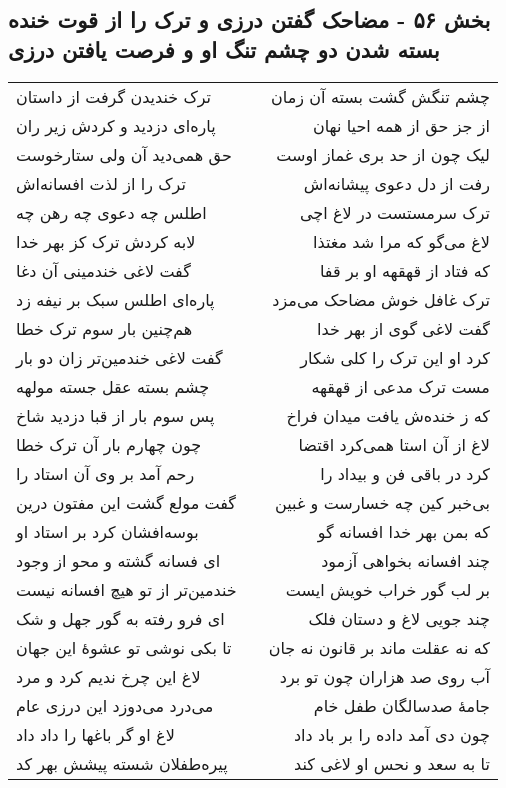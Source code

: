 \begin{center}
\section*{بخش ۵۶ - مضاحک گفتن درزی و ترک را از قوت خنده بسته شدن دو چشم تنگ او و فرصت یافتن درزی}
\label{sec:sh056}
\begin{longtable}{l p{0.5cm} r}
ترک خندیدن گرفت از داستان
&&
چشم تنگش گشت بسته آن زمان
\\
پاره‌ای دزدید و کردش زیر ران
&&
از جز حق از همه احیا نهان
\\
حق همی‌دید آن ولی ستارخوست
&&
لیک چون از حد بری غماز اوست
\\
ترک را از لذت افسانه‌اش
&&
رفت از دل دعوی پیشانه‌اش
\\
اطلس چه دعوی چه رهن چه
&&
ترک سرمستست در لاغ اچی
\\
لابه کردش ترک کز بهر خدا
&&
لاغ می‌گو که مرا شد مغتذا
\\
گفت لاغی خندمینی آن دغا
&&
که فتاد از قهقهه او بر قفا
\\
پاره‌ای اطلس سبک بر نیفه زد
&&
ترک غافل خوش مضاحک می‌مزد
\\
هم‌چنین بار سوم ترک خطا
&&
گفت لاغی گوی از بهر خدا
\\
گفت لاغی خندمین‌تر زان دو بار
&&
کرد او این ترک را کلی شکار
\\
چشم بسته عقل جسته مولهه
&&
مست ترک مدعی از قهقهه
\\
پس سوم بار از قبا دزدید شاخ
&&
که ز خنده‌ش یافت میدان فراخ
\\
چون چهارم بار آن ترک خطا
&&
لاغ از آن استا همی‌کرد اقتضا
\\
رحم آمد بر وی آن استاد را
&&
کرد در باقی فن و بیداد را
\\
گفت مولع گشت این مفتون درین
&&
بی‌خبر کین چه خسارست و غبین
\\
بوسه‌افشان کرد بر استاد او
&&
که بمن بهر خدا افسانه گو
\\
ای فسانه گشته و محو از وجود
&&
چند افسانه بخواهی آزمود
\\
خندمین‌تر از تو هیچ افسانه نیست
&&
بر لب گور خراب خویش ایست
\\
ای فرو رفته به گور جهل و شک
&&
چند جویی لاغ و دستان فلک
\\
تا بکی نوشی تو عشوهٔ این جهان
&&
که نه عقلت ماند بر قانون نه جان
\\
لاغ این چرخ ندیم کرد و مرد
&&
آب روی صد هزاران چون تو برد
\\
می‌درد می‌دوزد این درزی عام
&&
جامهٔ صدسالگان طفل خام
\\
لاغ او گر باغها را داد داد
&&
چون دی آمد داده را بر باد داد
\\
پیره‌طفلان شسته پیشش بهر کد
&&
تا به سعد و نحس او لاغی کند
\\
\end{longtable}
\end{center}
